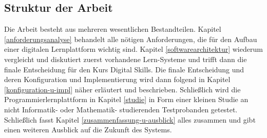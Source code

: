 \subsection{Struktur der Arbeit}\label{struktur-der-arbeit}
Die Arbeit besteht aus mehreren wesentlichen Bestandteilen. Kapitel
\ref{anforderungsanalyse} behandelt alle nötigen Anforderungen, die für den
Aufbau einer digitalen Lernplattform wichtig sind. Kapitel
\ref{softwarearchitektur} wiederum vergleicht und diskutiert zuerst vorhandene
Lern-Systeme und trifft dann die finale Entscheidung für den Kurs Digital
Skills. Die finale Entscheidung und deren Konfiguration und Implementierung wird
dann folgend in Kapitel \ref{konfiguration-u-impl} näher erläutert und
beschrieben. Schließlich wird die Programmierlernplattform in Kapitel
\ref{studie} in Form einer kleinen Studie an nicht Informatik- oder Mathematik-
studierenden Testprobanden getestet. Schließlich fasst Kapitel
\ref{zusammenfassung-u-ausblick} alles zusammen und gibt einen weiteren Ausblick
auf die Zukunft des Systems.